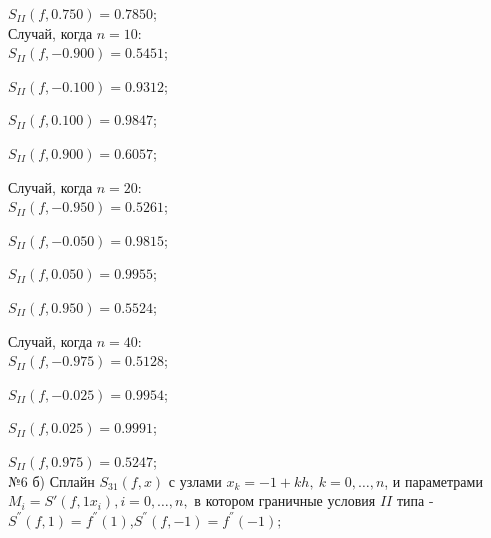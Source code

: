 \documentclass[rus, 12 pt]{article}
\begin{document}
    
    $S_{II}(f,0.750)=0.7850$;\\

    
    

    
    Случай, когда $n=10$:\\

    
    

    
    $S_{II}(f,-0.900)=0.5451$;

    
    $S_{II}(f,-0.100)=0.9312$;

    
    $S_{II}(f,0.100)=0.9847$;

    
    $S_{II}(f,0.900)=0.6057$;

    
    

    
    Случай, когда $n=20$:\\

    
    

    
    $S_{II}(f,-0.950)=0.5261$;

    
    $S_{II}(f,-0.050)=0.9815$;

    
    $S_{II}(f,0.050)=0.9955$;

    
    $S_{II}(f,0.950)=0.5524$;

    
    

    
    Случай, когда $n=40$:\\

    
    

    
    $S_{II}(f,-0.975)=0.5128$;

    
    $S_{II}(f,-0.025)=0.9954$;

    
    $S_{II}(f,0.025)=0.9991$;

    
    $S_{II}(f,0.975)=0.5247$;\\

    
    

    
    №6 б) Сплайн \(S_{31}(f,x)\) с узлами \(x_k=-1+kh,\:k=0,\ldots,n\), и
параметрами \(M_i=S'(f,1x_i),i=0,\ldots,n,\) в котором граничные условия
\(II\) типа - \(S^{''}(f,1)=f^{''}(1)\),\(S^{''}(f,-1)=f^{''}(-1);\)
\end{document}
